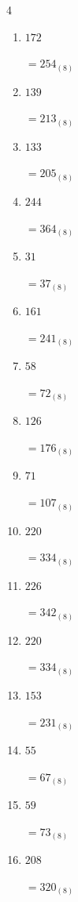 \begin{multicols}{4}
\begin{enumerate}
        $=174_{(8)}$

  \item $172$

        $=254_{(8)}$

  \item $139$

        $=213_{(8)}$

  \item $133$

        $=205_{(8)}$

  \item $244$

        $=364_{(8)}$

  \item $31$

        $=37_{(8)}$

  \item $161$

        $=241_{(8)}$

  \item $58$

        $=72_{(8)}$

  \item $126$

        $=176_{(8)}$

  \item $71$

        $=107_{(8)}$

  \item $220$

        $=334_{(8)}$

  \item $226$

        $=342_{(8)}$

\columnbreak %

  \item $220$

        $=334_{(8)}$

  \item $153$

        $=231_{(8)}$

  \item $55$

        $=67_{(8)}$

  \item $59$

        $=73_{(8)}$

  \item $208$

        $=320_{(8)}$


\end{enumerate}
\end{multicols}
